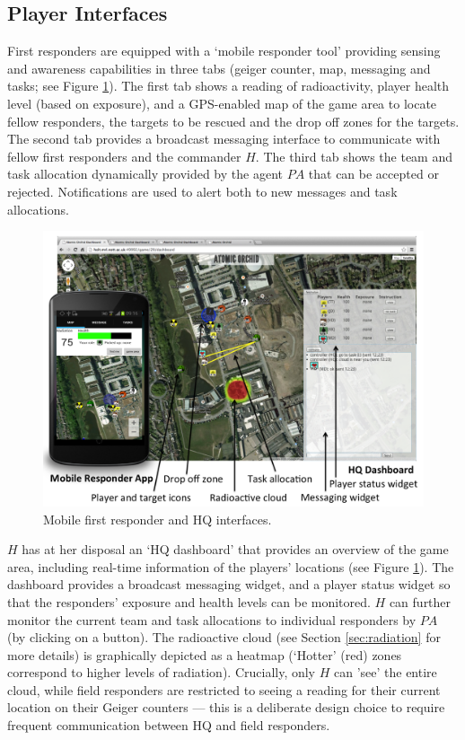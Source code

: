 \subsection{Player Interfaces}
\noindent First responders are equipped with a `mobile responder tool' providing sensing and awareness capabilities in three tabs (geiger cou\-nter, map, messaging and tasks; see Figure \ref{fig:ui}). The first tab shows a reading of radioactivity, player health level (based on exposure), and a GPS-enabled map of the game area to locate fellow responders, the targets to be rescued and the drop off zones for the targets. The second tab provides a broadcast messaging interface to communicate with fellow first responders and the commander $H$. The third tab shows the team and task allocation dynamically provided by the agent $PA$ that can be accepted or rejected. Notifications are used to alert both to new messages and task allocations.

\begin{figure}[htbp]
\includegraphics[width=\columnwidth]{UI.png}
\caption{Mobile first responder and HQ interfaces.}\vspace{-3mm}
\label{fig:ui}
\end{figure}
$H$ has at her disposal an `HQ dashboard' that provides an over\-view of the game area, including real-time information of the players' locations (see Figure \ref{fig:ui}). The dashboard provides a broadcast messaging widget, and a player status widget so that the responders' exposure and health levels can be monitored. $H$ can further monitor the  current team and task allocations to individual responders by $PA$ (by clicking on a button). The radioactive cloud (see Section \ref{sec:radiation} for more details) is graphically depicted as a heatmap (`Hotter'  (red) zones correspond to higher levels of radiation). Crucially, only  $H$ can 'see' the entire cloud, while field responders are restricted to seeing a reading for their current location on their Geiger counters --- this is a deliberate design choice to require frequent communication between HQ and field responders. 

